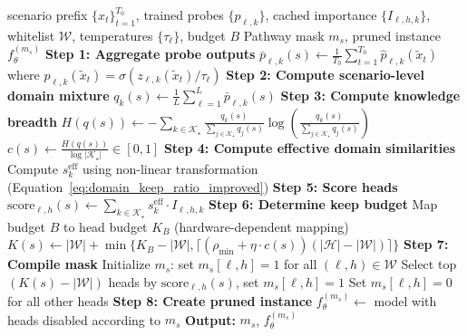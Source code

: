 \FloatBarrier
\begin{algorithm*}[!t]
\caption{PSP Online Compilation}
\label{alg:psp_online}
\begin{algorithmic}[1]
\REQUIRE scenario prefix $\{x_t\}_{t=1}^{T_0}$, trained probes $\{p_{\ell,k}\}$, cached importance $\{I_{\ell,h,k}\}$, whitelist $\mathcal{W}$, temperatures $\{\tau_\ell\}$, budget $B$
\ENSURE Pathway mask $m_s$, pruned instance $f_{\theta}^{(m_s)}$
\STATE \textbf{Step 1: Aggregate probe outputs}
        \STATE $\bar{p}_{\ell,k}(s) \leftarrow \frac{1}{T_0} \sum_{t=1}^{T_0} \hat{p}_{\ell,k}(\tilde{x}_t)$
        \STATE where $\hat{p}_{\ell,k}(\tilde{x}_t) = \sigma(z_{\ell,k}(\tilde{x}_t) / \tau_\ell)$
    \ENDFOR
\ENDFOR
\STATE \textbf{Step 2: Compute scenario-level domain mixture}
    \STATE $q_k(s) \leftarrow \frac{1}{L} \sum_{\ell=1}^{L} \bar{p}_{\ell,k}(s)$
\ENDFOR
\STATE \textbf{Step 3: Compute knowledge breadth}
\STATE $H(q(s)) \leftarrow -\sum_{k \in \mathcal{K}_\star} \frac{q_k(s)}{\sum_{j \in \mathcal{K}_\star} q_j(s)} \log\left(\frac{q_k(s)}{\sum_{j \in \mathcal{K}_\star} q_j(s)}\right)$
\STATE $c(s) \leftarrow \frac{H(q(s))}{\log |\mathcal{K}_\star|} \in [0,1]$
\STATE \textbf{Step 4: Compute effective domain similarities}
    \STATE Compute $s_k^{\text{eff}}$ using non-linear transformation (Equation~\eqref{eq:domain_keep_ratio_improved})
\ENDFOR
\STATE \textbf{Step 5: Score heads}
    \STATE $\mathrm{score}_{\ell,h}(s) \leftarrow \sum_{k \in \mathcal{K}_\star} s_k^{\text{eff}} \cdot I_{\ell,h,k}$
\ENDFOR
\STATE \textbf{Step 6: Determine keep budget}
\STATE Map budget $B$ to head budget $K_B$ (hardware-dependent mapping)
\STATE $K(s) \leftarrow |\mathcal{W}| + \min\{K_B - |\mathcal{W}|, \lceil(\rho_{\min} + \eta \cdot c(s))(|\mathcal{H}| - |\mathcal{W}|)\rceil\}$
\STATE \textbf{Step 7: Compile mask}
\STATE Initialize $m_s$: set $m_s[\ell,h] = 1$ for all $(\ell,h) \in \mathcal{W}$
\STATE Select top $(K(s) - |\mathcal{W}|)$ heads by $\mathrm{score}_{\ell,h}(s)$, set $m_s[\ell,h] = 1$
\STATE Set $m_s[\ell,h] = 0$ for all other heads
\STATE \textbf{Step 8: Create pruned instance}
\STATE $f_{\theta}^{(m_s)} \leftarrow$ model with heads disabled according to $m_s$
\STATE \textbf{Output:} $m_s$, $f_{\theta}^{(m_s)}$
\end{algorithmic}
\end{algorithm*}

